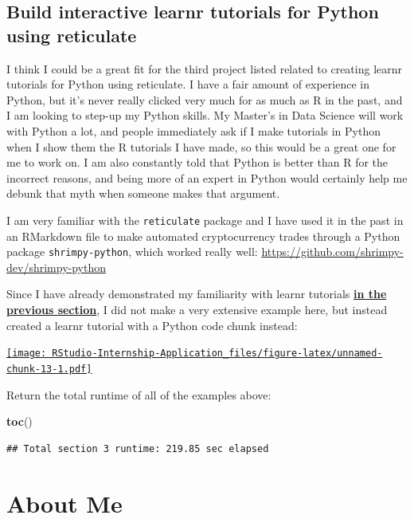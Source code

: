 \documentclass[
]{book}
\newenvironment{Shaded}{\begin{snugshade}}{\end{snugshade}}
\newcommand{\KeywordTok}[1]{\textcolor[rgb]{0.13,0.29,0.53}{\textbf{#1}}}
\newcommand{\NormalTok}[1]{#1}
\begin{document}
\hypertarget{build-interactive-learnr-tutorials-for-python-using-reticulate}{%
\section{Build interactive learnr tutorials for Python using reticulate}\label{build-interactive-learnr-tutorials-for-python-using-reticulate}}

I think I could be a great fit for the third project listed related to creating learnr tutorials for Python using reticulate. I have a fair amount of experience in Python, but it's never really clicked very much for as much as R in the past, and I am looking to step-up my Python skills. My Master's in Data Science will work with Python a lot, and people immediately ask if I make tutorials in Python when I show them the R tutorials I have made, so this would be a great one for me to work on. I am also constantly told that Python is better than R for the incorrect reasons, and being more of an expert in Python would certainly help me debunk that myth when someone makes that argument.

I am very familiar with the \texttt{reticulate} package and I have used it in the past in an RMarkdown file to make automated cryptocurrency trades through a Python package \texttt{shrimpy-python}, which worked really well: \url{https://github.com/shrimpy-dev/shrimpy-python}

Since I have already demonstrated my familiarity with learnr tutorials \textbf{\protect\hyperlink{learnr}{in the previous section}}, I did not make a very extensive example here, but instead created a learnr tutorial with a Python code chunk instead:

\href{https://predictcrypto.shinyapps.io/python_project3_example/}{\texttt{[image: RStudio-Internship-Application\_files/figure-latex/unnamed-chunk-13-1.pdf]}}

Return the total runtime of all of the examples above:

\begin{Shaded}
\begin{Highlighting}[]
\KeywordTok{toc}\NormalTok{()}
\end{Highlighting}
\end{Shaded}

\begin{verbatim}
## Total section 3 runtime: 219.85 sec elapsed
\end{verbatim}

\hypertarget{about-me}{%
\chapter{About Me}\label{about-me}}
\end{document}
